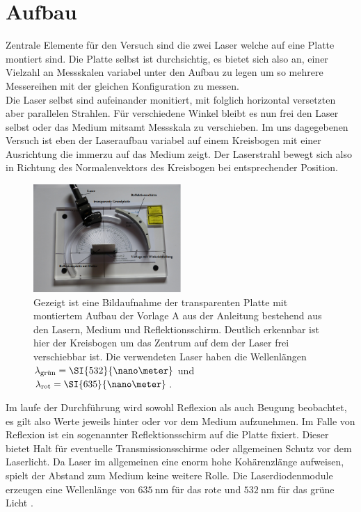 \newpage
\section{Aufbau}
Zentrale Elemente für den Versuch sind die zwei Laser welche auf eine Platte montiert sind. Die Platte selbst ist durchsichtig,
es bietet sich also an, einer Vielzahl an Messskalen variabel unter den Aufbau zu legen um so mehrere Messereihen mit der gleichen 
Konfiguration zu messen. \\
Die Laser selbst sind aufeinander monitiert, mit folglich horizontal versetzten aber parallelen Strahlen. Für verschiedene
Winkel bleibt es nun frei den Laser selbst oder das Medium mitsamt Messskala zu verschieben. Im uns dagegebenen Versuch 
ist eben der Laseraufbau variabel auf einem Kreisbogen mit einer Ausrichtung die immerzu auf das Medium zeigt. Der Laserstrahl 
bewegt sich also in Richtung des Normalenvektors des Kreisbogen bei entsprechender Position. 
\begin{figure}
    \centering
    \includegraphics[width=0.5\textwidth]{bilder/afbau.png}
    \caption{Gezeigt ist eine Bildaufnahme der transparenten Platte mit montiertem Aufbau der Vorlage A aus der Anleitung \cite{skript} bestehend aus den Lasern, Medium und Reflektionsschirm.
    Deutlich erkennbar ist hier der Kreisbogen um das Zentrum auf dem der Laser frei verschiebbar ist. Die verwendeten Laser haben die Wellenlängen $\protect \lambda_{\text{grün}} = \SI{532}{\nano\meter}$ und $\protect \lambda_{\text{rot}} = \SI{635}{\nano\meter}$. \cite{skript}}
    \label{fig:teile}
\end{figure}
\FloatBarrier
\flushleft Im laufe der Durchführung wird sowohl Reflexion als auch Beugung beobachtet, es gilt also Werte jeweils hinter oder vor dem Medium 
aufzunehmen. Im Falle von Reflexion ist ein sogenannter Reflektionsschirm auf die Platte fixiert. Dieser bietet Halt für eventuelle
Transmissionsschirme oder allgemeinen Schutz vor dem Laserlicht.
Da Laser im allgemeinen eine enorm hohe Kohärenzlänge aufweisen, spielt der Abstand zum Medium keine weitere Rolle. 
Die Laserdiodenmodule erzeugen eine Wellenlänge von $\SI{635}{\nano\meter}$ für das rote und $\SI{532}{\nano\meter}$ für das
grüne Licht \cite{skript}.

